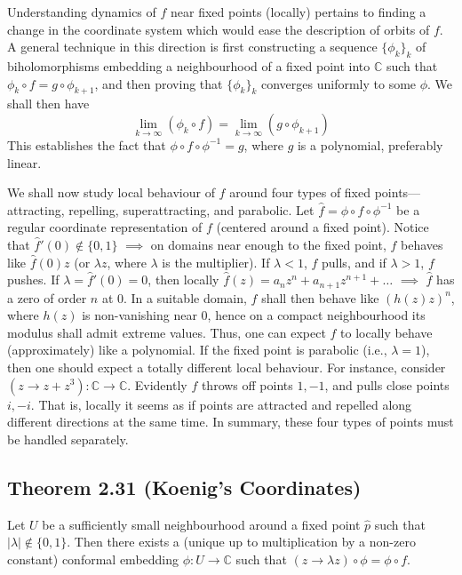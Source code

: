 \documentclass[11pt,a4paper]{article}
\begin{document}
        Understanding dynamics of $f$ near fixed points (locally) pertains to finding a change in the coordinate system which would ease the description of orbits of $f$. A general technique in this direction is first constructing a sequence $\{\phi_k\}_k$ of biholomorphisms embedding a neighbourhood of a fixed point into $\mathbb{C}$ such that $\phi_k \circ f = g \circ \phi_{k+1}$, and then proving that $\{\phi_k\}_k$ converges uniformly to some $\phi$. We shall then have
        $$\lim_{k \rightarrow \infty}(\phi_k \circ f) = \lim_{k \rightarrow \infty}(g \circ \phi_{k+1})$$ This establishes the fact that $\phi \circ f \circ \phi^{-1} = g$, where $g$ is a polynomial, preferably linear.

        We shall now study local behaviour of $f$ around four types of fixed points---attracting, repelling, superattracting, and parabolic. Let $\hat{f} = \phi \circ f \circ \phi^{-1}$ be a regular coordinate representation of $f$ (centered around a fixed point). Notice that $\hat{f}'(0) \notin \{0, 1\}$ $\implies$ on domains near enough to the fixed point, $f$ behaves like $\hat{f}(0)z$ (or $\lambda z$, where $\lambda $ is the multiplier). If $\lambda <1$, $f$ pulls, and if $\lambda > 1$, $f$ pushes. If $\lambda = \hat{f}'(0) = 0$, then locally $\hat{f}(z) = a_nz^n + a_{n+1}z^{n+1} + \ldots$ $\implies$ $\hat{f}$ has a zero of order $n$ at $0$. In a suitable domain, $f$ shall then behave like $(h(z)z)^n$, where $h(z)$ is non-vanishing near $0$, hence on a compact neighbourhood its modulus shall admit extreme values. Thus, one can expect $f$ to locally behave (approximately) like a polynomial. If the fixed point is parabolic (i.e., $\lambda = 1$), then one should expect a totally different local behaviour. For instance, consider $(z \rightarrow z + z^3): \mathbb{C} \rightarrow \mathbb{C}$. Evidently $f$ throws off points $1, -1$, and pulls close points $i, -i$. That is, locally it seems as if points are attracted and repelled along different directions at the same time. In summary, these four types of points must be handled separately.

        \subsection*{Theorem 2.31 (Koenig's Coordinates)} Let $U$ be a sufficiently small neighbourhood around a fixed point $\hat{p}$ such that $|\lambda| \notin \{0, 1\}$. Then there exists a (unique up to multiplication by a non-zero constant) conformal embedding $\phi: U \rightarrow \mathbb{C}$ such that $(z \rightarrow \lambda z) \circ \phi = \phi \circ f$.
\end{document}
